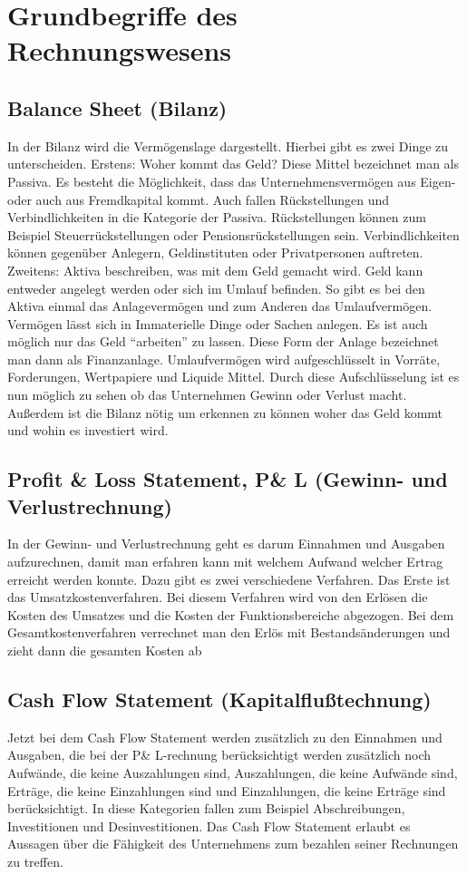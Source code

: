 \section{Grundbegriffe des Rechnungswesens}

\subsection{Balance Sheet (Bilanz)}
In der Bilanz wird die Vermögenslage dargestellt. Hierbei gibt es zwei Dinge zu unterscheiden.
Erstens: Woher kommt das Geld? Diese Mittel bezeichnet man als Passiva. Es besteht die Möglichkeit, dass das Unternehmensvermögen aus Eigen- oder auch aus Fremdkapital kommt. Auch fallen Rückstellungen und Verbindlichkeiten in die Kategorie der Passiva. Rückstellungen können zum Beispiel Steuerrückstellungen oder Pensionsrückstellungen sein. Verbindlichkeiten können gegenüber Anlegern, Geldinstituten oder Privatpersonen auftreten.
Zweitens: Aktiva beschreiben, was mit dem Geld gemacht wird. Geld kann entweder angelegt werden oder sich im Umlauf befinden. So gibt es bei den Aktiva einmal das Anlagevermögen und zum Anderen das Umlaufvermögen. Vermögen lässt sich in Immaterielle Dinge oder Sachen anlegen. Es ist auch möglich nur das Geld “arbeiten” zu lassen. Diese Form der Anlage bezeichnet man dann als Finanzanlage. Umlaufvermögen wird aufgeschlüsselt in Vorräte, Forderungen, Wertpapiere und Liquide Mittel.
Durch diese Aufschlüsselung ist es nun möglich zu sehen ob das Unternehmen Gewinn oder Verlust macht. Außerdem ist die Bilanz nötig um erkennen zu können woher das Geld kommt und wohin es investiert wird.

\subsection{Profit \& Loss Statement, P\& L (Gewinn- und Verlustrechnung)}
In der Gewinn- und Verlustrechnung geht es darum Einnahmen und Ausgaben aufzurechnen, damit man erfahren kann mit welchem Aufwand welcher Ertrag erreicht werden konnte. Dazu gibt es zwei verschiedene Verfahren. Das Erste ist das Umsatzkostenverfahren. Bei diesem Verfahren wird von den Erlösen die Kosten des Umsatzes und die Kosten der Funktionsbereiche abgezogen.
Bei dem Gesamtkostenverfahren verrechnet man den Erlös mit Bestandsänderungen und zieht dann die gesamten Kosten ab

\subsection{Cash Flow Statement (Kapitalflußtechnung)}
Jetzt bei dem Cash Flow Statement werden zusätzlich zu den Einnahmen und Ausgaben, die bei der P\& L-rechnung berücksichtigt werden zusätzlich noch Aufwände, die keine Auszahlungen sind, Auszahlungen, die keine Aufwände sind, Erträge, die keine Einzahlungen sind und Einzahlungen, die keine Erträge sind berücksichtigt. In diese Kategorien fallen zum Beispiel Abschreibungen, Investitionen und Desinvestitionen.
Das Cash Flow Statement erlaubt es Aussagen über die Fähigkeit des Unternehmens zum bezahlen seiner Rechnungen zu treffen.
